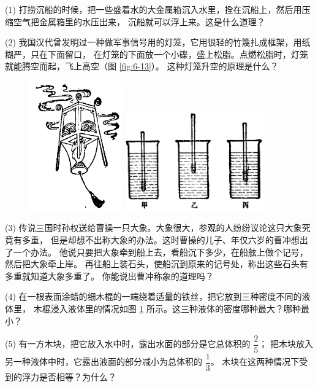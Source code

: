 \lianxi

(1) 打捞沉船的时候，把一些盛着水的大金属箱沉入水里，拴在沉船上，然后用压缩空气把金属箱里的水压出来，
沉船就可以浮上来。这是什么道理？

(2) 我国汉代曾发明过一种做军事信号用的灯笼，它用很轻的竹篾扎成框架，用纸糊严，只在下面留口，
在灯笼的下面放一个小碟，盛上松脂。点燃松脂时，灯笼就能腾空而起，飞上高空（图 \ref{fig:6-13}）。
这种灯笼升空的原理是什么？

\begin{figure}[htbp]
    \centering
    \begin{minipage}{7cm}
    \centering
    \includegraphics[width=4cm]{../pic/czwl1-ch6-13}
    \caption{}\label{fig:6-13}
    \end{minipage}
    \qquad
    \begin{minipage}{7cm}
    \centering
    \includegraphics[width=6cm]{../pic/czwl1-ch6-14}
    \caption{}\label{fig:6-14}
    \end{minipage}
\end{figure}

(3) 传说三国时孙权送给曹操一只大象。大象很大，参观的人纷纷议论这只大象究竟有多重，
但是却想不出称大象的办法。这时曹操的儿子、年仅六岁的曹冲想出了一个办法。
他说只要把大象牵到船上去，看船沉下多少，在船舷上做个记号，然后把大象牵上岸。
再往船上装石头，使船沉到原来的记号处，称出这些石头有多重就知道大象多重了。
你能说出曹冲称象的道理吗？

(4) 在一根表面涂蜡的细木棍的一端绕着适量的铁丝，把它放到三种密度不同的液体里，
木棍浸入液体里的情况如图 \ref{fig:6-14} 所示。这三种液体的密度哪种最大？哪种最小？

(5) 有一方木块，把它放入水中时，露出水面的部分是它总体积的 $\dfrac{2}{5}$；
把木块放入另一种液体中时，它露出液面的部分减小为总体积的 $\dfrac{1}{3}$。
木块在这两种情况下受到的浮力是否相等？为什么？




